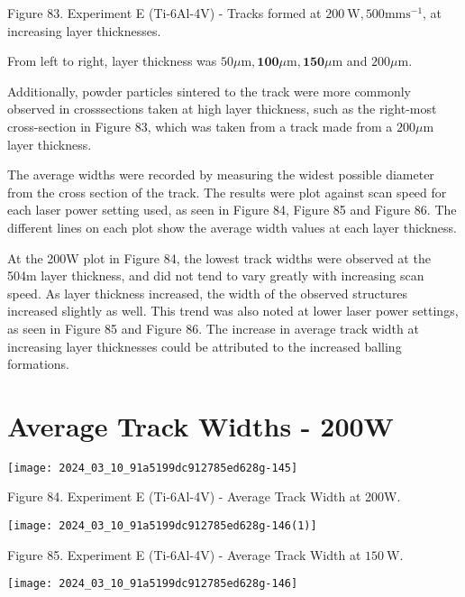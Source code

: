 \documentclass[10pt]{article}
\begin{document}
Figure 83. Experiment E (Ti-6Al-4V) - Tracks formed at $200 \mathrm{~W}, 500 \mathrm{mms}^{-1}$, at increasing layer thicknesses.

From left to right, layer thickness was $50 \mu \mathrm{m}, \mathbf{1 0 0} \mu \mathrm{m}, \mathbf{1 5 0} \mu \mathrm{m}$ and $200 \mu \mathrm{m}$.

Additionally, powder particles sintered to the track were more commonly observed in crosssections taken at high layer thickness, such as the right-most cross-section in Figure 83, which was taken from a track made from a $200 \mu \mathrm{m}$ layer thickness.

The average widths were recorded by measuring the widest possible diameter from the cross section of the track. The results were plot against scan speed for each laser power setting used, as seen in Figure 84, Figure 85 and Figure 86. The different lines on each plot show the average width values at each layer thickness.

At the 200W plot in Figure 84, the lowest track widths were observed at the 504m layer thickness, and did not tend to vary greatly with increasing scan speed. As layer thickness increased, the width of the observed structures increased slightly as well. This trend was also noted at lower laser power settings, as seen in Figure 85 and Figure 86. The increase in average track width at increasing layer thicknesses could be attributed to the increased balling formations.

\section*{Average Track Widths - 200W}
\begin{center}
\texttt{[image: 2024\_03\_10\_91a5199dc912785ed628g-145]}
\end{center}

Figure 84. Experiment E (Ti-6Al-4V) - Average Track Width at 200W.

\begin{center}
\texttt{[image: 2024\_03\_10\_91a5199dc912785ed628g-146(1)]}
\end{center}

Figure 85. Experiment E (Ti-6Al-4V) - Average Track Width at $150 \mathrm{~W}$.

\begin{center}
\texttt{[image: 2024\_03\_10\_91a5199dc912785ed628g-146]}
\end{center}
\end{document}
